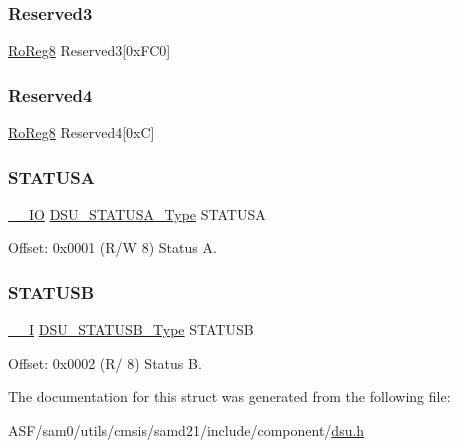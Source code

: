 \mbox{\label{struct_dsu_ababa6cb5a34643305b6839c2ac1d5ed8}} 
\subsubsection{\texorpdfstring{Reserved3}{Reserved3}}
{\footnotesize\ttfamily \mbox{\hyperlink{group___s_a_m_d21_e15_a__definitions_ga0d957f1433aaf5d70e4dc2b68288442d}{Ro\+Reg8}} Reserved3\mbox{[}0x\+F\+C0\mbox{]}}

\mbox{\label{struct_dsu_af3a36aca215654d294560ffdd73e40b3}} 
\subsubsection{\texorpdfstring{Reserved4}{Reserved4}}
{\footnotesize\ttfamily \mbox{\hyperlink{group___s_a_m_d21_e15_a__definitions_ga0d957f1433aaf5d70e4dc2b68288442d}{Ro\+Reg8}} Reserved4\mbox{[}0x\+C\mbox{]}}

\mbox{\label{struct_dsu_a6759acda48815d98f344c56148ba52ac}} 
\subsubsection{\texorpdfstring{STATUSA}{STATUSA}}
{\footnotesize\ttfamily \mbox{\hyperlink{core__cm0plus_8h_aec43007d9998a0a0e01faede4133d6be}{\+\_\+\+\_\+\+IO}} \mbox{\hyperlink{union_d_s_u___s_t_a_t_u_s_a___type}{D\+S\+U\+\_\+\+S\+T\+A\+T\+U\+S\+A\+\_\+\+Type}} S\+T\+A\+T\+U\+SA}



Offset\+: 0x0001 (R/W 8) Status A. 

\mbox{\label{struct_dsu_a6184b4b81bad58bef585f6ecd1dbe027}} 
\subsubsection{\texorpdfstring{STATUSB}{STATUSB}}
{\footnotesize\ttfamily \mbox{\hyperlink{core__cm0plus_8h_af63697ed9952cc71e1225efe205f6cd3}{\+\_\+\+\_\+I}} \mbox{\hyperlink{union_d_s_u___s_t_a_t_u_s_b___type}{D\+S\+U\+\_\+\+S\+T\+A\+T\+U\+S\+B\+\_\+\+Type}} S\+T\+A\+T\+U\+SB}



Offset\+: 0x0002 (R/ 8) Status B. 



The documentation for this struct was generated from the following file\+:\begin{DoxyCompactItemize}
\item 
A\+S\+F/sam0/utils/cmsis/samd21/include/component/\mbox{\hyperlink{component_2dsu_8h}{dsu.\+h}}\end{DoxyCompactItemize}
